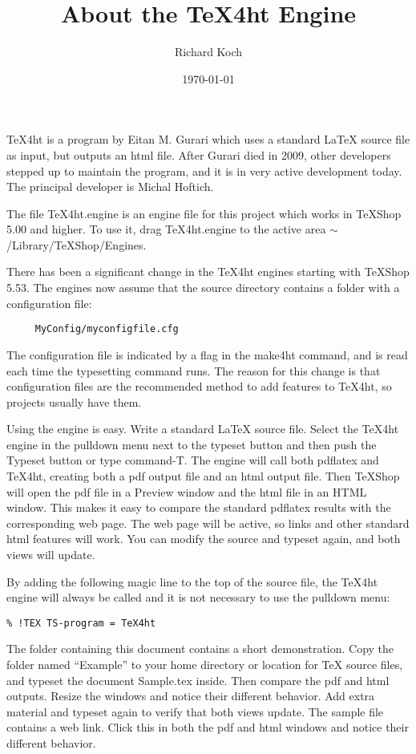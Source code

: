 \documentclass[11pt, oneside]{article}   	%
\title{About the TeX4ht Engine}
\author{Richard Koch}
\date{\today}							%
\begin{document}
\maketitle

TeX4ht is a program by Eitan M. Gurari which uses a standard LaTeX source file as
input, but outputs an html file. After Gurari died in 2009, other developers stepped up to
maintain the program, and it is in very active development today. The principal developer
is Michal Hoftich.

The file TeX4ht.engine is an engine file for this project which works in TeXShop 5.00 and
higher. To use it, drag TeX4ht.engine to the active area $\sim$/Library/TeXShop/Engines.

There has been a significant change in the TeX4ht engines starting with TeXShop 5.53.
The engines now assume that the source  directory contains a folder with a configuration file:
\begin{verbatim}
     MyConfig/myconfigfile.cfg
\end{verbatim}
The configuration
file is indicated by a flag in the make4ht command, and is read each time the typesetting
command runs. The reason for this change is that configuration files are the
recommended method to add features to TeX4ht, so  projects usually have them.

Using the engine is easy. Write a standard LaTeX source file. Select the TeX4ht engine in
the pulldown menu next to the typeset button and then push the Typeset button or type
command-T. The engine will call both pdflatex and TeX4ht, creating both a pdf output
file and an html output file. Then TeXShop will open the pdf file in a Preview window and
the html file in an HTML window. This makes it easy to compare the standard pdflatex
results with the corresponding web page. The web page will be active, so links and other
standard html features will work. You can modify the source and typeset again, and both
views will update.

By adding the following magic line to the top of the source file, the TeX4ht engine will
always be called and it is not necessary to use the pulldown menu:
\begin{verbatim}
% !TEX TS-program = TeX4ht
\end{verbatim}

\newpage

The folder containing this document  contains a short demonstration. Copy the folder
named “Example” to your home directory or location for TeX source files, and typeset the
document Sample.tex inside. Then compare the pdf and html outputs. Resize the windows
and notice their different behavior. Add extra material and typeset again to verify that
both views update. The sample file contains a web link. Click this in both the pdf and
html windows and notice their different behavior.
\end{document}
